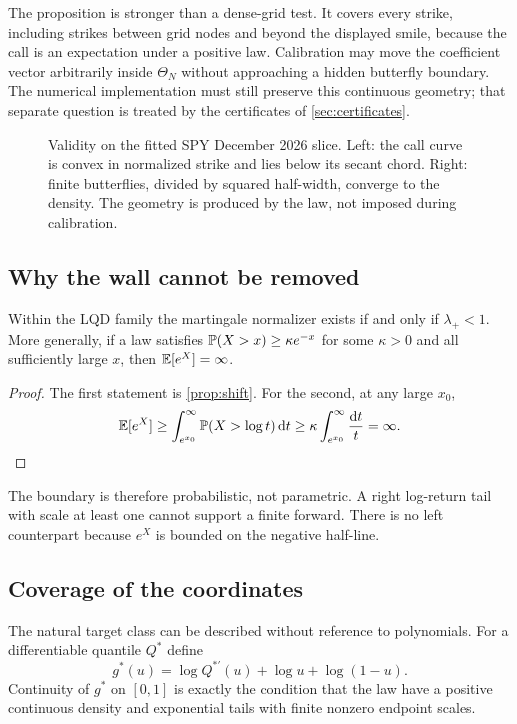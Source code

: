 The proposition is stronger than a dense-grid test.  It covers every strike,
including strikes between grid nodes and beyond the displayed smile, because
the call is an expectation under a positive law.  Calibration may move the
coefficient vector arbitrarily inside $\Theta_N$ without approaching a hidden
butterfly boundary.  The numerical implementation must still preserve this
continuous geometry; that separate question is treated by the certificates
of \cref{sec:certificates}.

\begin{figure}[htbp]
\centering
{}
\caption{Validity on the fitted SPY December 2026 slice.  Left: the call
curve is convex in normalized strike and lies below its secant chord.  Right:
finite butterflies, divided by squared half-width, converge to the density.
The geometry is produced by the law, not imposed during calibration.}
\label{fig:butterfly}
\end{figure}

\subsection{Why the wall cannot be removed}

\begin{proposition}
\label{prop:wall}
Within the LQD family the martingale normalizer exists if and only if
$\lambda_+<1$.  More generally, if a law satisfies
$\mathbb{P}(X>x)\ge\kappa e^{-x}$ for some $\kappa>0$ and all sufficiently large
$x$, then $\mathbb{E}[e^X]=\infty$.
\end{proposition}

\begin{proof}
The first statement is \cref{prop:shift}.  For the second, at any large
$x_0$,
\[
\mathbb{E}[e^X]\ge\int_{e^{x_0}}^\infty\mathbb{P}(X>\log t)\,\mathrm{d} t
\ge\kappa\int_{e^{x_0}}^\infty\frac{\mathrm{d} t}{t}=\infty.
\]
\end{proof}

The boundary is therefore probabilistic, not parametric.  A right log-return
tail with scale at least one cannot support a finite forward.  There is no
left counterpart because $e^X$ is bounded on the negative half-line.

\subsection{Coverage of the coordinates}

The natural target class can be described without reference to polynomials.
For a differentiable quantile $Q^*$ define
\[
g^*(u)=\log Q^{*\prime}(u)+\log u+\log(1-u).
\]
Continuity of $g^*$ on $[0,1]$ is exactly the condition that the law have a
positive continuous density and exponential tails with finite nonzero endpoint
scales.

